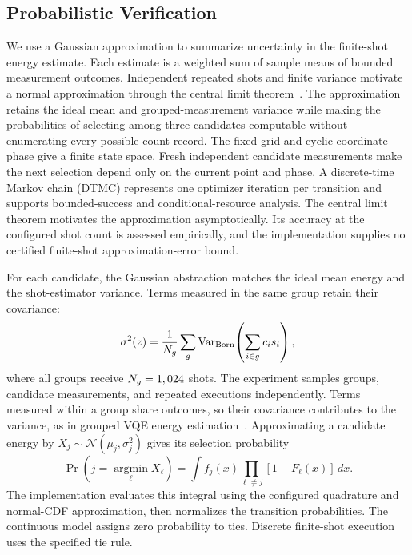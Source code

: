 \documentclass[conference]{IEEEtran}
\begin{document}
\subsection{Probabilistic Verification}
\label{sec:probabilistic}
We use a Gaussian approximation to summarize uncertainty in the finite-shot energy estimate. Each estimate is a weighted sum of sample means of bounded measurement outcomes. Independent repeated shots and finite variance motivate a normal approximation through the central limit theorem~\cite{mcclean2016}. The approximation retains the ideal mean and grouped-measurement variance while making the probabilities of selecting among three candidates computable without enumerating every possible count record. The fixed grid and cyclic coordinate phase give a finite state space. Fresh independent candidate measurements make the next selection depend only on the current point and phase. A discrete-time Markov chain (DTMC) represents one optimizer iteration per transition and supports bounded-success and conditional-resource analysis. The central limit theorem motivates the approximation asymptotically. Its accuracy at the configured shot count is assessed empirically, and the implementation supplies no certified finite-shot approximation-error bound.

For each candidate, the Gaussian abstraction matches the ideal mean energy and the shot-estimator variance. Terms measured in the same group retain their covariance:
\begin{equation}
 \sigma^2(z)=\frac{1}{N_g}\sum_g
 \operatorname{Var}_{\rm Born}\!\left(\sum_{i\in g}c_i s_i\right),
 \label{eq:variance}
\end{equation}
where all groups receive $N_g=1,024$ shots. The experiment samples groups, candidate measurements, and repeated executions independently. Terms measured within a group share outcomes, so their covariance contributes to the variance, as in grouped VQE energy estimation~\cite{mcclean2016,tilly2022}. Approximating a candidate energy by $X_j\sim\mathcal N(\mu_j,\sigma_j^2)$ gives its selection probability
\begin{equation}
 \Pr(j=\operatorname*{argmin}_\ell X_\ell)
 =\int f_j(x)\prod_{\ell\ne j}[1-F_\ell(x)]\,dx.
 \label{eq:selection}
\end{equation}
The implementation evaluates this integral using the configured quadrature and normal-CDF approximation, then normalizes the transition probabilities. The continuous model assigns zero probability to ties. Discrete finite-shot execution uses the specified tie rule.
\end{document}
